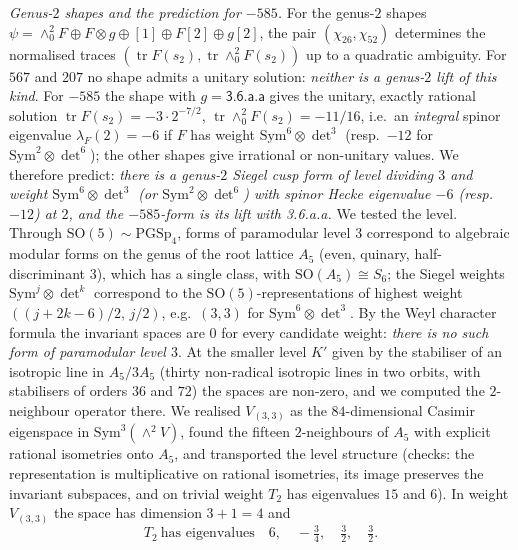 \documentclass[11pt]{amsart}
\theoremstyle{definition}
\begin{document}
\emph{Genus-$2$ shapes and the prediction for $-585$.} For the genus-$2$ shapes $\psi=\wedge^2_0F\oplus F\otimes g\oplus[1]\oplus F[2]\oplus g[2]$, the pair $(\chi_{26},\chi_{52})$ determines the normalised traces $(\operatorname{tr}F(s_2),\operatorname{tr}\wedge^2_0F(s_2))$ up to a quadratic ambiguity. For $567$ and $207$ no shape admits a unitary solution: \emph{neither is a genus-$2$ lift of this kind}. For $-585$ the shape with $g=\textsf{3.6.a.a}$ gives the unitary, exactly rational solution $\operatorname{tr}F(s_2)=-3\cdot2^{-7/2}$, $\operatorname{tr}\wedge^2_0F(s_2)=-11/16$, i.e.\ an \emph{integral} spinor eigenvalue $\lambda_F(2)=-6$ if $F$ has weight $\mathrm{Sym}^6\otimes\det^3$ (resp.\ $-12$ for $\mathrm{Sym}^2\otimes\det^6$); the other shapes give irrational or non-unitary values. We therefore predict: \emph{there is a genus-$2$ Siegel cusp form of level dividing $3$ and weight $\mathrm{Sym}^6\otimes\det^3$ (or $\mathrm{Sym}^2\otimes\det^6$) with spinor Hecke eigenvalue $-6$ (resp.\ $-12$) at $2$, and the $-585$-form is its lift with \textsf{3.6.a.a}.} We tested the level. Through $\mathrm{SO}(5)\sim\mathrm{PGSp}_4$, forms of paramodular level $3$ correspond to algebraic modular forms on the genus of the root lattice $A_5$ (even, quinary, half-discriminant $3$), which has a single class, with $\mathrm{SO}(A_5)\cong S_6$; the Siegel weights $\mathrm{Sym}^j\otimes\det^k$ correspond to the $\mathrm{SO}(5)$-representations of highest weight $((j+2k-6)/2,\,j/2)$, e.g.\ $(3,3)$ for $\mathrm{Sym}^6\otimes\det^3$. By the Weyl character formula the invariant spaces are $0$ for every candidate weight: \emph{there is no such form of paramodular level $3$}. At the smaller level $K'$ given by the stabiliser of an isotropic line in $A_5/3A_5$ (thirty non-radical isotropic lines in two orbits, with stabilisers of orders $36$ and $72$) the spaces are non-zero, and we computed the $2$-neighbour operator there. We realised $V_{(3,3)}$ as the $84$-dimensional Casimir eigenspace in $\mathrm{Sym}^3(\wedge^2V)$, found the fifteen $2$-neighbours of $A_5$ with explicit rational isometries onto $A_5$, and transported the level structure (checks: the representation is multiplicative on rational isometries, its image preserves the invariant subspaces, and on trivial weight $T_2$ has eigenvalues $15$ and $6$). In weight $V_{(3,3)}$ the space has dimension $3+1=4$ and
\[T_2\ \text{has eigenvalues}\quad 6,\quad -\tfrac34,\quad \tfrac32,\quad \tfrac32 .\]
\end{document}

